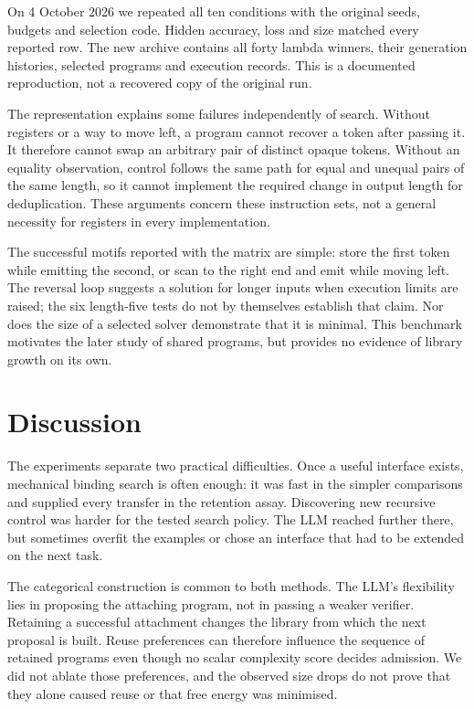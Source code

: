\documentclass[11pt]{article}
\begin{document}
On 4 October 2026 we repeated all ten conditions with the original seeds,
budgets and selection code. Hidden accuracy, loss and size matched every
reported row. The new archive contains all forty lambda winners, their
generation histories, selected programs and execution records. This is a
documented reproduction, not a recovered copy of the original run.

The representation explains some failures independently of search. Without
registers or a way to move left, a program cannot recover a token after passing
it. It therefore cannot swap an arbitrary pair of distinct opaque tokens.
Without an equality observation, control follows the same path for equal and
unequal pairs of the same length, so it cannot implement the required change
in output length for deduplication. These arguments concern these instruction
sets, not a general necessity for registers in every implementation.

The successful motifs reported with the matrix are simple: store the first
token while emitting the second, or scan to the right end and emit while
moving left. The reversal loop suggests a solution for longer inputs when
execution limits are raised; the six length-five tests do not by themselves
establish that claim. Nor does the size of a selected solver demonstrate that
it is minimal. This benchmark motivates the later study of shared programs,
but provides no evidence of library growth on its own.



\section{Discussion}

The experiments separate two practical difficulties. Once a useful interface
exists, mechanical binding search is often enough: it was fast in the simpler
comparisons and supplied every transfer in the retention assay. Discovering
new recursive control was harder for the tested search policy. The LLM reached
further there, but sometimes overfit the examples or chose an interface that
had to be extended on the next task.

The categorical construction is common to both methods. The LLM's flexibility
lies in proposing the attaching program, not in passing a weaker verifier.
Retaining a successful attachment changes the library from which the next
proposal is built. Reuse preferences can therefore influence the sequence of
retained programs even though no scalar complexity score decides admission.
We did not ablate those preferences, and the observed size drops do not prove
that they alone caused reuse or that free energy was minimised.
\end{document}
